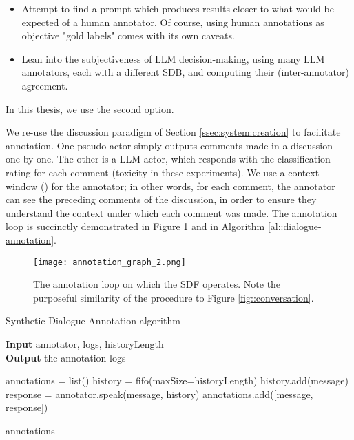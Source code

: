 \begin{itemize}
	\item Attempt to find a prompt which produces results closer to what would be expected of a human annotator. Of course, using human annotations as objective "gold labels" comes with its own caveats.
	\item Lean into the subjectiveness of LLM decision-making, using many LLM annotators, each with a different \ac{SDB}, and computing their (inter-annotator) agreement.
\end{itemize}

In this thesis, we use the second option.

We re-use the discussion paradigm of Section \ref{ssec:system:creation} to facilitate annotation. One pseudo-actor simply outputs comments made in a discussion one-by-one. The other is a LLM actor, which responds with the classification rating for each comment (toxicity in these experiments).  We use a context window  () for the annotator; in other words, for each comment, the annotator can see the  preceding comments of the discussion, in order to ensure they understand the context under which each comment was made. The annotation loop is succinctly demonstrated in Figure \ref{fig::annotation} and in Algorithm \ref{al::dialogue-annotation}.

\begin{figure}
	\centering
	\texttt{[image: annotation\_graph\_2.png]}
	\caption{The annotation loop on which the \ac{SDF} operates. Note the purposeful similarity of the procedure to Figure \ref{fig::conversation}.}
	\label{fig::annotation}
\end{figure}

\begin{algorithm}
	\caption{Synthetic Dialogue Annotation algorithm} 
	\label{al::dialogue-annotation}
	\hspace*{\algorithmicindent} \textbf{Input} annotator, logs, historyLength\\
	\hspace*{\algorithmicindent} \textbf{Output} the annotation logs
	\begin{algorithmic}[1]	
		\State annotations = list()
		\State history = fifo(maxSize=historyLength)
		\State 
		\State history.add(message)
		\State response = annotator.speak(message, history)
		\State annotations.add([message, response])
		\EndFor
		
		\State \Return annotations
	\end{algorithmic} 
\end{algorithm}


